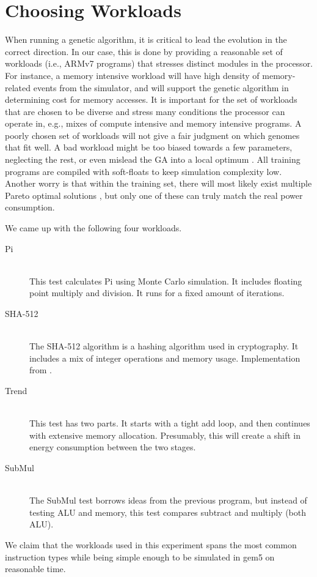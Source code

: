 \section{Choosing Workloads}
\label{sec:workloads}

When running a genetic algorithm, it is critical to lead the evolution in the
correct direction. In our case, this is done by providing a reasonable set of
workloads (i.e., ARMv7 programs) that stresses distinct modules in the processor.
For instance, a memory intensive workload will have high density of
memory-related events from the simulator, and will support the genetic algorithm
in determining cost for memory accesses. It is important for the set of
workloads that are chosen to be diverse and stress many conditions the processor
can operate in, e.g., mixes of compute intensive and memory intensive programs. A
poorly chosen set of workloads will not give a fair judgment on which genomes
that fit well. A bad workload might be too biased towards a few parameters,
neglecting the rest, or even mislead the GA into a local optimum
\cite{introtoga}. All training programs are compiled with soft-floats to keep
simulation complexity low. Another worry is that within the training set, there
will most likely exist multiple Pareto optimal solutions \cite{deb2014multi},
but only one of these can truly match the real power consumption.

We came up with the following four workloads.

\begin{description}
    \item[Pi] \hfill \\
        This test calculates Pi using Monte Carlo simulation. It includes
        floating point multiply and division. It runs for a fixed amount of
        iterations.
    \item[SHA-512] \hfill \\
        The SHA-512 algorithm is a hashing algorithm used in cryptography. It
        includes a mix of integer operations and memory usage. Implementation
        from \cite{sha2}.
    \item[Trend] \hfill \\
        This test has two parts. It starts with a tight add loop, and then
        continues with extensive memory allocation. Presumably, this will create
        a shift in energy consumption between the two stages.
    \item[SubMul] \hfill \\
        The SubMul test borrows ideas from the previous program, but instead of
        testing ALU and memory, this test compares subtract and multiply (both
        ALU).
\end{description}

We claim that the workloads used in this experiment spans the most common
instruction types while being simple enough to be simulated in gem5 on
reasonable time.

